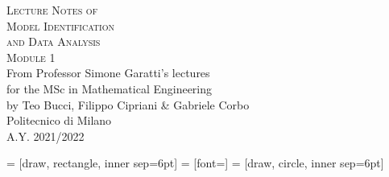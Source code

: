 \documentclass[10pt,a4paper,twoside]{book}
\begin{document}
\frontmatter

\pagestyle{empty}


\hypertarget{mytitlepage}{} %

\vspace*{\fill}
\begin{center}
	{\large \textsc{Lecture Notes of}}\\
	\vspace*{0.4cm}
	{\Huge \textsc{Model Identification}}\\
	\vspace*{0.4cm}
	{\Huge \textsc{and Data Analysis}}\\
	\vspace*{0.4cm}
	{\huge \textsc{Module 1}}\\
	\vspace*{1cm}
	{\large {From Professor Simone Garatti's lectures}}\\
	\vspace*{0.1cm}
	{\large for the MSc in Mathematical Engineering}\\
	\vspace*{0.4cm}
	{\large {by Teo Bucci, Filippo Cipriani \& Gabriele Corbo}}\\
	\vspace*{1cm}
	Politecnico di Milano\\A.Y. 2021/2022
\end{center}
\vspace*{\fill}
\clearpage


\hypertarget{mycopyright}{} %

\clearpage


\hypertarget{mypreface}{} %

\clearpage


\cleardoublepage
\pagestyle{toc}
\hypertarget{mytoc}{} %
\bookmark[dest=mytoc,level=chapter]{\contentsname} %
\tableofcontents
\cleardoublepage


\pagestyle{fancy}
\mainmatter

      = [draw, rectangle, inner sep=6pt]
 = [font=\small]
        = [draw, circle, inner sep=6pt]
\end{document}
